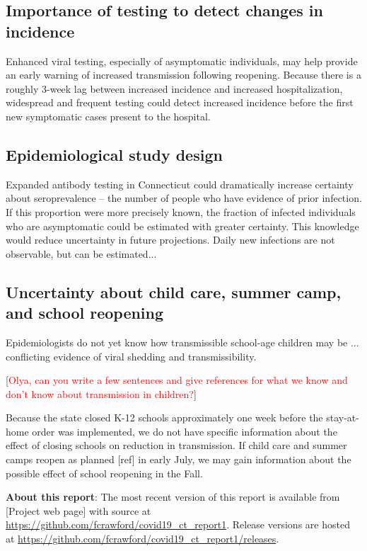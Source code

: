 \documentclass[11pt]{article}
\newcommand{\comment}[1]{[\textcolor{red}{#1}]}
\begin{document}
\subsection*{Importance of testing to detect changes in incidence}

Enhanced viral testing, especially of asymptomatic individuals, may help provide an early warning of increased transmission following reopening.  Because there is a roughly 3-week lag between increased incidence and increased hospitalization, widespread and frequent testing could detect increased incidence before the first new symptomatic cases present to the hospital. 

\subsection*{Epidemiological study design}

Expanded antibody testing in Connecticut could dramatically increase certainty about seroprevalence -- the number of people who have evidence of prior infection. If this proportion were more precisely known, the fraction of infected individuals who are asymptomatic could be estimated with greater certainty.  This knowledge would reduce uncertainty in future projections.  
Daily new infections are not observable, but can be estimated...



\subsection*{Uncertainty about child care, summer camp, and school reopening}

Epidemiologists do not yet know how transmissible school-age children may be ... conflicting evidence of viral shedding and transmissibility. 

\comment{Olya, can you write a few sentences and give references for what we know and don't know about transmission in children?}

Because the state closed K-12 schools approximately one week before the stay-at-home order was implemented, we do not have specific information about the effect of closing schools on reduction in transmission.  If child care and summer camps reopen as planned [ref] in early July, we may gain information about the possible effect of school reopening in the Fall.  



\textbf{About this report}: The most recent version of this report is available from [Project web page] with source at \url{https://github.com/fcrawford/covid19_ct_report1}. Release versions are hosted at \url{https://github.com/fcrawford/covid19_ct_report1/releases}. 
\end{document}
